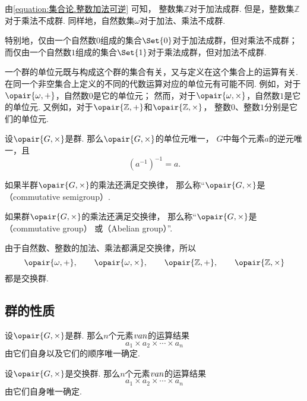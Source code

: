 由\cref{equation:集合论.整数加法可逆} 可知，
整数集\(\mathbb{Z}\)对于加法成群.
但是，整数集\(\mathbb{Z}\)对于乘法不成群.
同样地，自然数集\(\omega\)对于加法、乘法不成群.

特别地，仅由一个自然数\(0\)组成的集合\(\Set{0}\)对于加法成群，但对乘法不成群；
而仅由一个自然数\(1\)组成的集合\(\Set{1}\)对于乘法成群，但对加法不成群.

一个群的单位元既与构成这个群的集合有关，又与定义在这个集合上的运算有关.
在同一个非空集合上定义的不同的代数运算对应的单位元有可能不同.
例如，对于\(\opair{\omega,+}\)，自然数\(0\)是它的单位元；
然而，对于\(\opair{\omega,\times}\)，自然数\(1\)是它的单位元.
又例如，对于\(\opair{\mathbb{Z},+}\)和\(\opair{\mathbb{Z},\times}\)，
整数\(0\)、整数\(1\)分别是它们的单位元.

\begin{property}
设\(\opair{G,\times}\)是群.
那么\(\opair{G,\times}\)的单位元唯一，
\(G\)中每个元素\(a\)的逆元唯一，且\[
    (a^{-1})^{-1} = a.
\]
\end{property}

\begin{definition}
如果半群\(\opair{G,\times}\)的乘法还满足交换律，
那么称“\(\opair{G,\times}\)是（commutative semigroup）.
\end{definition}

\begin{definition}
如果群\(\opair{G,\times}\)的乘法还满足交换律，
那么称“\(\opair{G,\times}\)是（commutative group）%
或（Abelian group）”.
\end{definition}

由于自然数、整数的加法、乘法都满足交换律，所以\[
	\opair{\omega,+}, \qquad
	\opair{\omega,\times}, \qquad
	\opair{\mathbb{Z},+}, \qquad
	\opair{\mathbb{Z},\times}
\]都是交换群.

\subsection{群的性质}
\begin{theorem}
设\(\opair{G,\times}\)是群.
那么\(n\)个元素\(v{a}{n}\)的运算结果\[
	a_1 \times a_2 \times \dotsb \times a_n
\]由它们自身以及它们的顺序唯一确定.
\end{theorem}

\begin{corollary}
设\(\opair{G,\times}\)是交换群.
那么\(n\)个元素\(v{a}{n}\)的运算结果\[
	a_1 \times a_2 \times \dotsb \times a_n
\]由它们自身唯一确定.
\end{corollary}

